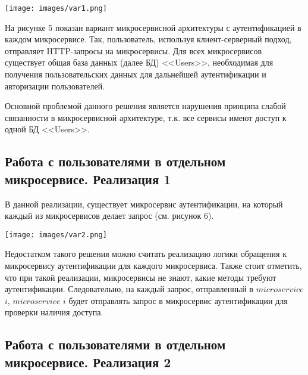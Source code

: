         \noindent\begin{minipage}[t]{\textwidth}
             \begin{center}
             \texttt{[image: images/var1.png]}
             \end{center} \label{fig:Moreno}
        
        \end{minipage}
        На рисунке 5 показан вариант микросервисной архитектуры с аутентификацией в каждом микросервисе. Так, пользователь, используя клиент-серверный подход, отправляет HTTP-запросы на микросервисы. Для всех микросервисов существует общая база данных (далее БД) <<Users>>, необходимая для получения пользовательских данных для дальнейшей аутентификации и авторизации пользователей. 

        Основной проблемой данного решения является нарушения принципа слабой связанности в микросервисной архитектуре, т.к. все сервисы имеют доступ к одной БД <<Users>>. 

         \subsection{Работа с пользователями в отдельном микросервисе. Реализация 1}
    
         В данной реализации, существует микросервис аутентификации, на который каждый из микросервисов делает запрос (см. рисунок 6). 
         \noindent\begin{minipage}[t]{\textwidth}
             \begin{center}
             \texttt{[image: images/var2.png]}
             \end{center} \label{fig:Moreno}
        
        \end{minipage}
         Недостатком такого решения можно считать реализацию логики обращения к микросервису аутентификации для каждого микросервиса. Также стоит отметить, что при такой реализации, микросервисы не знают, какие методы требуют аутентификации. Следовательно, на каждый запрос, отправленный в  $microservice$ $i$, $microservice$ $i$ будет отправлять запрос в микросервис аутентификации для проверки наличия доступа.

         \subsection{Работа с пользователями в отдельном микросервисе. Реализация 2}
    
